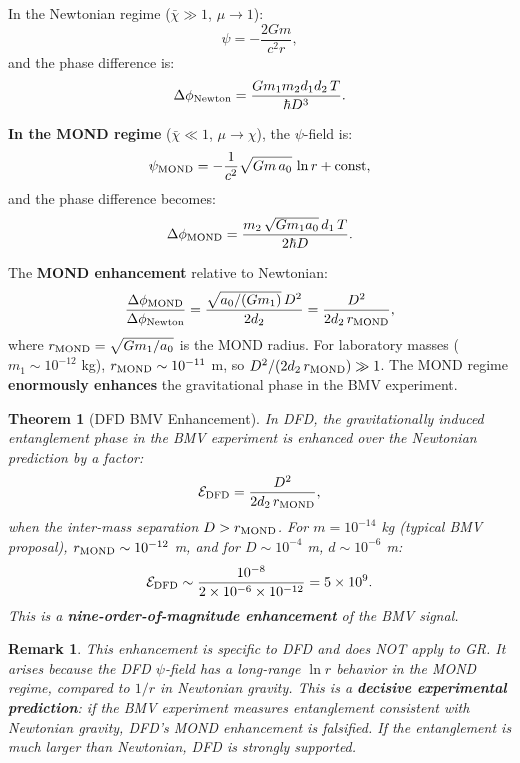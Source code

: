 \documentclass[11pt,a4paper]{article}
\newtheorem{theorem}{Theorem}
\newtheorem{remark}{Remark}
\begin{document}
In the Newtonian regime ($\bar\chi \gg 1$, $\mu \to 1$):
\begin{equation}
\psi = -\frac{2Gm}{c^2 r},
\end{equation}
and the phase difference is:
\begin{equation}
\Delta\phi_{\rm Newton} = \frac{Gm_1 m_2 d_1 d_2\,T}{\hbar D^3}.
\end{equation}

\textbf{In the MOND regime} ($\bar\chi \ll 1$, $\mu \to \chi$), the $\psi$-field is:
\begin{equation}
\psi_{\rm MOND} = -\frac{1}{c^2}\sqrt{Gm\,a_0}\,\ln r + \text{const},
\end{equation}
and the phase difference becomes:
\begin{equation}
\Delta\phi_{\rm MOND} = \frac{m_2\,\sqrt{Gm_1 a_0}\,d_1\,T}{2\hbar D}.
\end{equation}

The \textbf{MOND enhancement} relative to Newtonian:
\begin{equation}
\frac{\Delta\phi_{\rm MOND}}{\Delta\phi_{\rm Newton}}
= \frac{\sqrt{a_0/(Gm_1)}\,D^2}{2d_2}
= \frac{D^2}{2d_2\,r_{\rm MOND}},
\end{equation}
where $r_{\rm MOND} = \sqrt{Gm_1/a_0}$ is the MOND radius. For laboratory masses ($m_1 \sim 10^{-12}$ kg), $r_{\rm MOND} \sim 10^{-11}$ m, so $D^2/(2d_2\,r_{\rm MOND}) \gg 1$. The MOND regime \textbf{enormously enhances} the gravitational phase in the BMV experiment.

\begin{theorem}[DFD BMV Enhancement]
\label{thm:BMV-enhance}
In DFD, the gravitationally induced entanglement phase in the BMV experiment is enhanced over the Newtonian prediction by a factor:
\begin{equation}
\mathcal{E}_{\rm DFD} = \frac{D^2}{2d_2\,r_{\rm MOND}},
\end{equation}
when the inter-mass separation $D > r_{\rm MOND}$. For $m = 10^{-14}$ kg (typical BMV proposal), $r_{\rm MOND} \sim 10^{-12}$ m, and for $D \sim 10^{-4}$ m, $d \sim 10^{-6}$ m:
\begin{equation}
\mathcal{E}_{\rm DFD} \sim \frac{10^{-8}}{2\times 10^{-6}\times 10^{-12}} = 5\times 10^{9}.
\end{equation}
This is a \textbf{nine-order-of-magnitude enhancement} of the BMV signal.
\end{theorem}

\begin{remark}
This enhancement is specific to DFD and does NOT apply to GR. It arises because the DFD $\psi$-field has a long-range $\ln r$ behavior in the MOND regime, compared to $1/r$ in Newtonian gravity. This is a \textbf{decisive experimental prediction}: if the BMV experiment measures entanglement consistent with Newtonian gravity, DFD's MOND enhancement is falsified. If the entanglement is much larger than Newtonian, DFD is strongly supported.
\end{remark}
\end{document}
